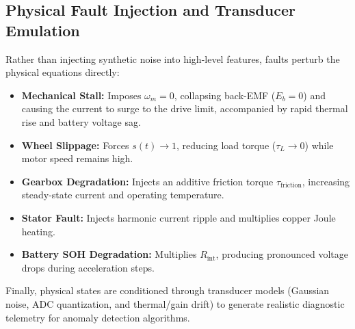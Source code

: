 \subsection{Physical Fault Injection and Transducer Emulation}

Rather than injecting synthetic noise into high-level features, faults perturb the physical equations directly:
\begin{itemize}
    \item \textbf{Mechanical Stall:} Imposes $\omega_m = 0$, collapsing back-EMF ($E_b = 0$) and causing the current to surge to the drive limit, accompanied by rapid thermal rise and battery voltage sag.
    \item \textbf{Wheel Slippage:} Forces $s(t) \to 1$, reducing load torque ($\tau_L \to 0$) while motor speed remains high.
    \item \textbf{Gearbox Degradation:} Injects an additive friction torque $\tau_{\mathrm{friction}}$, increasing steady-state current and operating temperature.
    \item \textbf{Stator Fault:} Injects harmonic current ripple and multiplies copper Joule heating.
    \item \textbf{Battery SOH Degradation:} Multiplies $R_{\mathrm{int}}$, producing pronounced voltage drops during acceleration steps.
\end{itemize}

Finally, physical states are conditioned through transducer models (Gaussian noise, ADC quantization, and thermal/gain drift) to generate realistic diagnostic telemetry for anomaly detection algorithms.
